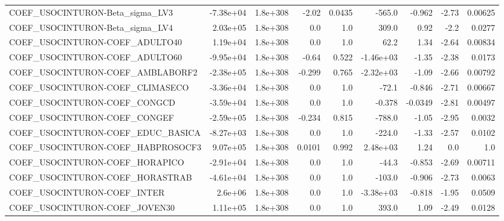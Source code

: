 \begin{tabular}{lrrrrrrrr}
COEF\_USOCINTURON-Beta\_sigma\_LV3   &   -7.38e+04 &     1.8e+308 &   -2.02 &   0.0435 &     -565.0 &      -0.962 &        -2.73 &       0.00625 \\
COEF\_USOCINTURON-Beta\_sigma\_LV4   &    2.03e+05 &     1.8e+308 &     0.0 &      1.0 &      309.0 &        0.92 &         -2.2 &        0.0277 \\
COEF\_USOCINTURON-COEF\_ADULTO40    &    1.19e+04 &     1.8e+308 &     0.0 &      1.0 &       62.2 &        1.34 &        -2.64 &       0.00834 \\
COEF\_USOCINTURON-COEF\_ADULTO60    &   -9.95e+04 &     1.8e+308 &   -0.64 &    0.522 &  -1.46e+03 &       -1.35 &        -2.38 &        0.0173 \\
COEF\_USOCINTURON-COEF\_AMBLABORF2  &   -2.38e+05 &     1.8e+308 &  -0.299 &    0.765 &  -2.32e+03 &       -1.09 &        -2.66 &       0.00792 \\
COEF\_USOCINTURON-COEF\_CLIMASECO   &   -3.36e+04 &     1.8e+308 &     0.0 &      1.0 &      -72.1 &      -0.846 &        -2.71 &       0.00667 \\
COEF\_USOCINTURON-COEF\_CONGCD      &   -3.59e+04 &     1.8e+308 &     0.0 &      1.0 &     -0.378 &     -0.0349 &        -2.81 &       0.00497 \\
COEF\_USOCINTURON-COEF\_CONGEF      &   -2.59e+05 &     1.8e+308 &  -0.234 &    0.815 &     -788.0 &       -1.05 &        -2.95 &        0.0032 \\
COEF\_USOCINTURON-COEF\_EDUC\_BASICA &   -8.27e+03 &     1.8e+308 &     0.0 &      1.0 &     -224.0 &       -1.33 &        -2.57 &        0.0102 \\
COEF\_USOCINTURON-COEF\_HABPROSOCF3 &    9.07e+05 &     1.8e+308 &  0.0101 &    0.992 &   2.48e+03 &        1.24 &          0.0 &           1.0 \\
COEF\_USOCINTURON-COEF\_HORAPICO    &   -2.91e+04 &     1.8e+308 &     0.0 &      1.0 &      -44.3 &      -0.853 &        -2.69 &       0.00711 \\
COEF\_USOCINTURON-COEF\_HORASTRAB   &   -4.61e+04 &     1.8e+308 &     0.0 &      1.0 &     -103.0 &      -0.906 &        -2.73 &        0.0063 \\
COEF\_USOCINTURON-COEF\_INTER       &     2.6e+06 &     1.8e+308 &     0.0 &      1.0 &  -3.38e+03 &      -0.818 &        -1.95 &        0.0509 \\
COEF\_USOCINTURON-COEF\_JOVEN30     &    1.11e+05 &     1.8e+308 &     0.0 &      1.0 &      393.0 &        1.09 &        -2.49 &        0.0128 \\

\end{tabular}

